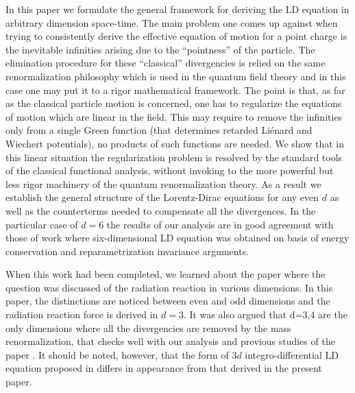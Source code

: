 \documentclass[a4paper,12pt]{article}
\begin{document}
In this paper we formulate the general framework for deriving the LD
equation in arbitrary dimension space-time. The main problem one comes up
against when trying to consistently derive the effective equation of motion
for a point charge is the inevitable infinities arising due to the
``pointness'' of the particle. The elimination procedure for these
``classical'' divergencies is relied on the same renormalization philosophy
which is used in the quantum field theory and in this case one may put it to
a rigor mathematical framework. The point is that, as far as the classical
particle motion is concerned, one has to regularize the equations of motion
which are linear in the field. This may require to remove the infinities
only from a single Green function (that determines retarded Li\'enard and
Wiechert potentials), no products of such functions are needed. We show that
in this linear situation the regularization problem is resolved by the
standard tools of the classical functional analysis, without invoking to the
more powerful but less rigor machinery of the quantum renormalization
theory. As a result we establish the general structure of the Lorentz-Dirac
equations for any even $d$ as well as the counterterms needed to compensate
all the divergences. In the particular case of $d=6$ the results of our
analysis are in good agreement with those of work \cite{Kos} where
six-dimensional LD equation was obtained on basis of energy conservation and
reparametrization invariance arguments.

When this work had been completed, we learned about the paper
\cite{Gal'tsov} where the question was discussed of the radiation
reaction in various dimensions. In this paper, the distinctions are
noticed between even and odd dimensions and the radiation reaction
force is derived in $d=3$. It was also argued that d=3,4 are the only
dimensions where all the divergencies are removed by the mass
renormalization, that checks well with our analysis and previous
studies of the paper \cite{Kos}. It should be noted, however, that
the form of $3d$ integro-differential LD equation proposed in
\cite{Gal'tsov} differs in appearance from that derived in the
present paper.
\end{document}

